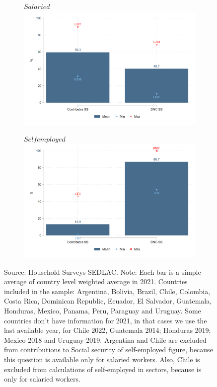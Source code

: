 \documentclass[english]{article}
\begin{document}
\begin{enumerate}
\begin{figure}[h!tbp]
\begin{subfigure}{.5\textwidth}
  \centering
    \footnotesize{$Salaried$}
  \includegraphics[width=1\textwidth]{latex/figures/Snapshot/Salaried-SS.png}
  \label{fig:salariedSS}
\end{subfigure}%
\begin{subfigure}{.5\textwidth}
  \centering
\footnotesize{$Self employed$}
\includegraphics[width=1\textwidth]{latex/figures/Snapshot/Self employed-SS.png}
  \label{fig:selfSS}
\end{subfigure}
\justifying
\footnotesize{Source: Household Surveys-SEDLAC.}
\footnotesize{Note: Each bar is a simple average of country level weighted average in 2021. Countries included in the sample: Argentina, Bolivia, Brazil, Chile, Colombia, Costa Rica, Dominican Republic, Ecuador, El Salvador, Guatemala, Honduras, Mexico, Panama, Peru, Paraguay and Uruguay. Some countries don’t have information for 2021, in that cases we use the last available year, for Chile 2022, Guatemala 2014; Honduras 2019; Mexico 2018 and Uruguay 2019. Argentina and Chile are excluded from contributions to Social security of self-employed figure, because this question is available only for salaried workers. Also, Chile is excluded from calculations of self-employed in sectors, because is only for salaried workers.}


\end{figure}
\end{enumerate}
\end{document}
